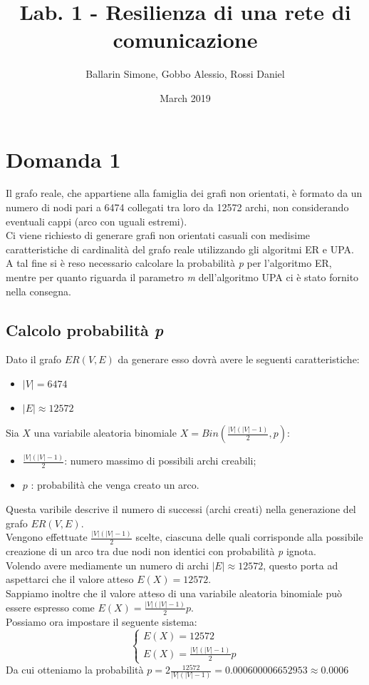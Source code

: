 \documentclass{article}
\title{Lab. 1 - Resilienza di una rete di comunicazione}
\author{Ballarin Simone, Gobbo Alessio, Rossi Daniel}
\date{March 2019}
\begin{document}
\maketitle

\section*{Domanda 1}
Il grafo reale, che appartiene alla famiglia dei grafi non orientati, è formato da un numero di nodi pari a 6474 collegati tra loro da 12572 archi, non considerando eventuali cappi (arco con uguali estremi).\\
Ci viene richiesto di generare grafi non orientati casuali con medisime caratteristiche di cardinalità del grafo reale utilizzando gli algoritmi ER e UPA.\\
A tal fine si è reso necessario calcolare la probabilità \textit{p} per l'algoritmo ER, mentre per quanto riguarda il parametro \textit{m} dell'algoritmo UPA ci è stato fornito nella consegna.\\
\subsection*{Calcolo probabilità \textit{p}}
Dato il grafo $ER(V,E)$ da generare esso dovrà avere le seguenti caratteristiche:
\begin{itemize}
	\item $|V|= 6474$
	\item $|E| \approx 12572$
\end{itemize}
Sia $X$ una variabile aleatoria binomiale $X=Bin(\frac{|V|(|V|-1)}{2},p)$:
\begin{itemize}
	\item $\frac{|V|(|V|-1)}{2}$: numero massimo di possibili archi creabili;
	\item $p$ : probabilità che venga creato un arco.
\end{itemize} 
Questa varibile descrive il numero di successi (archi creati) nella generazione del grafo $ER(V,E)$.\\
Vengono effettuate $\frac{|V|(|V|-1)}{2}$ scelte, ciascuna delle quali corrisponde alla possibile creazione di un arco tra due nodi non identici con probabilità \textit{p} ignota.\\
Volendo avere mediamente un numero di archi $|E| \approx 12572$, questo porta ad aspettarci che il valore atteso $E(X) = 12572$.\\
Sappiamo inoltre che il valore atteso di una variabile aleatoria binomiale può essere espresso come  $E(X)=\frac{|V|(|V|-1)}{2}p$.\\
Possiamo ora impostare il seguente sistema:
$$
\begin{cases}
	E(X) = 12572               \\ 
	E(X)=\frac{|V|(|V|-1)}{2}p 
\end{cases}
$$
Da cui otteniamo la probabilità $p = 2\frac{12572}{|V|(|V|-1)} = 0.000600006652953 \approx 0.0006$
\newpage
\end{document}
